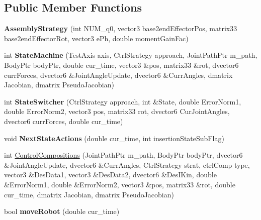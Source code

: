 \subsection*{Public Member Functions}
\begin{DoxyCompactItemize}
\item 
\hypertarget{classAssemblyStrategy_ad134c5635804dfb9aab8534d3d487c4e}{{\bfseries Assembly\-Strategy} (int N\-U\-M\-\_\-q0, vector3 base2end\-Effector\-Pos, matrix33 base2end\-Effector\-Rot, vector3 e\-Ph, double moment\-Gain\-Fac)}\label{classAssemblyStrategy_ad134c5635804dfb9aab8534d3d487c4e}

\item 
\hypertarget{classAssemblyStrategy_ade006233fa6145e54c4a421110aacf24}{int {\bfseries State\-Machine} (Test\-Axis axis, Ctrl\-Strategy approach, Joint\-Path\-Ptr m\-\_\-path, Body\-Ptr body\-Ptr, double cur\-\_\-time, vector3 \&pos, matrix33 \&rot, dvector6 curr\-Forces, dvector6 \&Joint\-Angle\-Update, dvector6 \&Curr\-Angles, dmatrix Jacobian, dmatrix Pseudo\-Jacobian)}\label{classAssemblyStrategy_ade006233fa6145e54c4a421110aacf24}

\item 
\hypertarget{classAssemblyStrategy_a6804833518b3528f348cfc93905e6d77}{int {\bfseries State\-Switcher} (Ctrl\-Strategy approach, int \&State, double Error\-Norm1, double Error\-Norm2, vector3 pos, matrix33 rot, dvector6 Cur\-Joint\-Angles, dvector6 curr\-Forces, double cur\-\_\-time)}\label{classAssemblyStrategy_a6804833518b3528f348cfc93905e6d77}

\item 
\hypertarget{classAssemblyStrategy_a972284a38be7a99f9e27260fbf95e355}{void {\bfseries Next\-State\-Actions} (double cur\-\_\-time, int insertion\-State\-Sub\-Flag)}\label{classAssemblyStrategy_a972284a38be7a99f9e27260fbf95e355}

\item 
int \hyperlink{classAssemblyStrategy_a3422fe5c769ae2ef9ff977b95cafbdd2}{Control\-Compositions} (Joint\-Path\-Ptr m\-\_\-path, Body\-Ptr body\-Ptr, dvector6 \&Joint\-Angle\-Update, dvector6 \&Curr\-Angles, Ctrl\-Strategy strat, ctrl\-Comp type, vector3 \&Des\-Data1, vector3 \&Des\-Data2, dvector6 \&Des\-I\-Kin, double \&Error\-Norm1, double \&Error\-Norm2, vector3 \&pos, matrix33 \&rot, double cur\-\_\-time, dmatrix Jacobian, dmatrix Pseudo\-Jacobian)
\item 
\hypertarget{classAssemblyStrategy_a21d108334b97b444ddf1f0fc1161d973}{bool {\bfseries move\-Robot} (double cur\-\_\-time)}\label{classAssemblyStrategy_a21d108334b97b444ddf1f0fc1161d973}


\end{DoxyCompactItemize}
